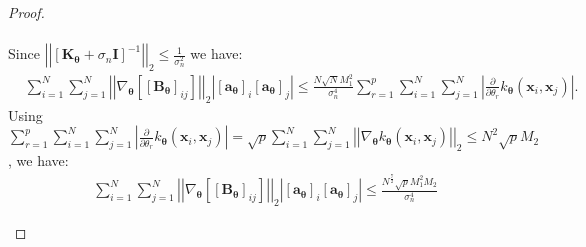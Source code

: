 \documentclass[jair,twoside,11pt,theapa]{article}
\theoremstyle{definition}
\begin{document}
\begin{proof}
\begin{enumerate}
\begin{align*}
    \end{align*}
    Since $\left|\left|\left[\bm{K}_{\boldsymbol{\theta}} + \sigma_{n}\boldsymbol{I}\right]^{-1}\right|\right|_2 \le\frac{1}{\sigma^2_n}$ we have:
    \begin{align*}
        &\sum_{i=1}^N\sum_{j=1}^N\left|\left|\nabla_{\bm{\theta}}\left[\left[\bm{B}_{\bm{\theta}}\right]_{ij}\right]\right|\right|_2\left|[\bm{a}_{\bm{\theta}}]_i[\bm{a}_{\bm{\theta}}]_j\right| \le \nonumber
        \frac{N\sqrt{N}M^2_1}{\sigma^4_n}\sum_{r=1}^p\sum_{i=1}^N\sum_{j=1}^N\left|\frac{\partial}{\partial\theta_r}k_{\boldsymbol{\theta}}(\boldsymbol{x}_i,\boldsymbol{x}_j)\right|.
    \end{align*}
    Using $\sum_{r=1}^p\sum_{i=1}^N\sum_{j=1}^N\left|\frac{\partial}{\partial\theta_r}k_{\bm{\theta}}(\bm{x}_i,\bm{x}_j)\right| = \sqrt{p}\sum_{i=1}^N\sum_{j=1}^N\left|\left|\nabla_{\boldsymbol{\theta}}k_{\boldsymbol{\theta}}(\boldsymbol{x}_i,\boldsymbol{x}_j)\right|\right|_2 \le N^2\sqrt{p}M_2$, we have:
    \begin{align*}
        &\sum_{i=1}^N\sum_{j=1}^N\left|\left|\nabla_{\bm{\theta}}\left[\left[\bm{B}_{\bm{\theta}}\right]_{ij}\right]\right|\right|_2\left|[\bm{a}_{\bm{\theta}}]_i[\bm{a}_{\bm{\theta}}]_j\right| \le \frac{N^{\frac{7}{2}}\sqrt{p}M^2_1M_2}{\sigma^4_n}
    \end{align*}
    

\end{enumerate}
\end{proof}
\end{document}

